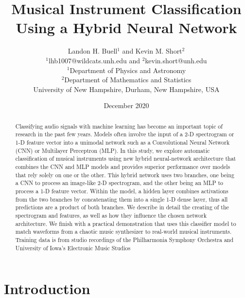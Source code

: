 \documentclass[conference,twocolumn,letterpaper]{IEEEtran}
\title{Musical Instrument Classification Using a Hybrid Neural Network}
\author{Landon H. Buell$^1$ and Kevin M. Short$^2$ \\
        $^1$lhb1007@wildcats.unh.edu and $^2$kevin.short@unh.edu\\
        $^1$Department of Physics and Astronomy\\
        $^2$Department of Mathematics and Statistics\\
        University of New Hampshire, Durham, New Hampshire, USA \\}
\date{December 2020}
\begin{document}
\maketitle


\begin{abstract}
    Classifying audio signals with machine learning has become an important topic of research in the past few years. Models often involve the input of a 2-D spectrogram or 1-D feature vector into a unimodal network such as a Convolutional Neural Network (CNN) or Multilayer Perceptron (MLP). In this study, we explore automatic classification of musical instruments using new hybrid neural-network architecture that combines the CNN and MLP models and provides superior performance over models that rely solely on one or the other. This hybrid network uses two branches, one being a CNN to process an image-like 2-D spectrogram, and the other being an MLP to process a 1-D feature vector. Within the model, a hidden layer combines activations from the two branches by concatenating them into a single 1-D dense layer, thus all predictions are a product of both branches. We describe in detail the creating of the spectrogram and features, as well as how they influence the chosen network architecture. We finish with a practical demonstration that uses this classifier model to match waveforms from a chaotic music synthesizer to real-world musical instruments. Training data is from studio recordings of the Philharmonia Symphony Orchestra and University of Iowa's Electronic Music Studios
\end{abstract}


\section{Introduction}
\label{sec:Intro}

\end{document}
